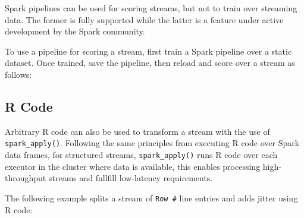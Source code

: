 \documentclass[]{book}
\newenvironment{Shaded}{\begin{snugshade}}{\end{snugshade}}
\newcommand{\KeywordTok}[1]{\textcolor[rgb]{0.13,0.29,0.53}{\textbf{#1}}}
\newcommand{\NormalTok}[1]{#1}
\newcommand{\OperatorTok}[1]{\textcolor[rgb]{0.81,0.36,0.00}{\textbf{#1}}}
\newcommand{\StringTok}[1]{\textcolor[rgb]{0.31,0.60,0.02}{#1}}
\theoremstyle{definition}
\theoremstyle{definition}
\theoremstyle{definition}
\theoremstyle{remark}
\begin{document}
Spark pipelines can be used for scoring streams, but not to train over
streaming data. The former is fully supported while the latter is a
feature under active development by the Spark community.

To use a pipeline for scoring a stream, first train a Spark pipeline
over a static dataset. Once trained, save the pipeline, then reload and
score over a stream as follows:

\begin{Shaded}
\end{Shaded}

\hypertarget{streams-r}{%
\subsection{R Code}\label{streams-r}}

Arbitrary R code can also be used to transform a stream with the use of
\texttt{spark\_apply()}. Following the same principles from executing R
code over Spark data frames, for structured streams,
\texttt{spark\_apply()} runs R code over each executor in the cluster
where data is available, this enables processing high-throughput streams
and fullfill low-latency requirements.

The following example splits a stream of \texttt{Row\ \#} line entries
and adds jitter using R code:

\begin{Shaded}
\end{Shaded}
\end{document}
